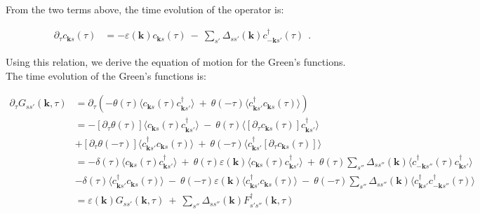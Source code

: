\documentclass[a4j]{jsarticle}
\begin{document}
From the two terms above, the time evolution of the operator is:

\begin{align}
	\partial_{\tau}
	c_{\bm{k}s} (\tau)
	 & =
	-
	\varepsilon( \bm{k} )
	c_{\bm{k} s} (\tau)
	\ - \
	\sum_{ s' }
	\Delta_{ s s' }( \bm{k} )
	c_{ - \bm{k} s'}^{\dagger} ( \tau )
	\ \ .
	\label{eqn:enzansihattenntime}
\end{align}

Using this relation, we derive the equation of motion for the Green's functions.
The time evolution of the Green's functions is:

\begin{align}
	\partial_{\tau} G_{ss'}(\bm{k} , \tau)
	 & =
	\partial_{\tau}
	\left(
	-
	\theta(\tau)
	\langle c_{\bm{k}s}(\tau) c_{\bm{k} s'}^{\dagger} \rangle
	\ + \
	\theta(- \tau)
	\langle c_{\bm{k} s'}^{\dagger} c_{\bm{k}s}(\tau) \rangle
	\right)
	\nonumber \\[4mm] &=
	-
	[\partial_{\tau} \theta(\tau) ]
	\langle c_{\bm{k}s}(\tau) c_{\bm{k} s'}^{\dagger} \rangle
	\ - \
	\theta(\tau)
	\langle
	[
		\partial_{\tau}
		c_{\bm{k}s}(\tau)
	]
	c_{\bm{k} s'}^{\dagger} \rangle
	\nonumber \\[2mm] &
	+
	[\partial_{\tau} \theta(- \tau) ]
	\langle c_{\bm{k} s'}^{\dagger} c_{\bm{k}s}(\tau) \rangle
	\ + \
	\theta(- \tau)
	\langle c_{\bm{k} s'}^{\dagger}
		[
			\partial_{\tau}
			c_{\bm{k}s}(\tau)
		]
	\rangle
	\nonumber \\[4mm] &=
	-
	\delta(\tau)
	\langle c_{\bm{k}s}(\tau) c_{\bm{k} s'}^{\dagger} \rangle
	\ + \
	\theta(\tau)
	\varepsilon( \bm{k} )
	\langle
	c_{\bm{k} s} (\tau)
	c_{\bm{k} s'}^{\dagger}
	\rangle
	\ + \
	\theta(\tau)
	\sum_{ s'' }
	\Delta_{ s s'' }( \bm{k} )
	\langle
	c_{ - \bm{k} s''}^{\dagger}(\tau)
	c_{\bm{k} s'}^{\dagger}
	\rangle
	\nonumber \\[2mm] &
	-
	\delta ( \tau )
	\langle c_{\bm{k} s'}^{\dagger} c_{\bm{k}s}(\tau) \rangle
	\ - \
	\theta(- \tau)
	\varepsilon( \bm{k} )
	\langle
	c_{\bm{k} s'}^{\dagger}
	c_{\bm{k} s} (\tau)
	\rangle
	\ - \
	\theta(-\tau)
	\sum_{ s'' }
	\Delta_{ s s'' }( \bm{k} )
	\langle
	c_{\bm{k} s'}^{\dagger}
	c_{ - \bm{k} s''}^{\dagger}(\tau)
	\rangle
	\nonumber \\[2mm] &=
	\varepsilon( \bm{k} )
	G_{ss'}(\bm{k} , \tau)
	\ + \
	\sum_{s''}
	\Delta_{ s s'' }( \bm{k} )
	F_{ s' s'' }^{\dagger} ( \bm{k} , \tau)
\end{align}
\end{document}
